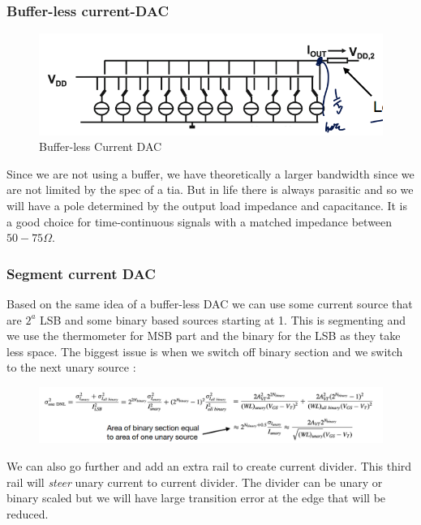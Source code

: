 \documentclass{report}
\begin{document}
\subsubsection{Buffer-less current-DAC}

\begin{figure}[H]
    \centering
    \includegraphics[width=0.75\linewidth]{img/bufferless_current_dac.png}
    \caption{Buffer-less Current DAC}
    \label{fig:BLC-DAC-label}
\end{figure}

Since we are not using a buffer, we have theoretically a larger bandwidth since we are not limited by the spec of a \gls{tia}. But in life there is always parasitic and so we will have a pole determined by the output load impedance and capacitance. It is a good choice for time-continuous signals with a matched impedance between $50-75\Omega$.

\subsubsection{Segment current DAC}

Based on the same idea of a buffer-less DAC we can use some current source that are $2^a$ LSB and some binary based sources starting at 1. This is segmenting and we use the thermometer for MSB part and the binary for the LSB as they take less space. The biggest issue is when we switch off binary section and we switch to the next unary source : 

\begin{figure}[H]
    \centering
    \includegraphics[width=0.95\linewidth]{eq_segme.png}
\end{figure}

We can also go further and add an extra rail to create current divider. This third rail will \textit{steer} unary current to current divider. The divider can be unary or binary scaled but we will have large transition error at the edge that will be reduced.
\end{document}
